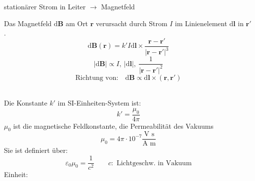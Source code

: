 \documentclass[titlepage,11pt,a4paper,ngerman]{report}
\newcommand{\tx}[1]{\textrm{#1}}
\newcommand{\dd}{\tx{d}}
\renewcommand{\vec}[1]{\boldsymbol{#1}}
\renewcommand{\epsilon}{\varepsilon}
\begin{document}
stationärer Strom in Leiter $ \rightarrow $ Magnetfeld\\
\begin{minipage}{.7\linewidth}
	Das Magnetfeld $ \dd\vec{B} $ am Ort $ \vec{r} $ verursacht durch Strom $ I $ im Linienelement $ \dd \vec{l} $ in $ \vec{r}' $.
	\begin{equation*}
	\dd \vec{B}(\vec{r}) = k' I \dd \vec{l} \times \frac{\vec{r} - \vec{r}'}{|\vec{r} - \vec{r}'|^3}
	\end{equation*}
	\begin{equation*}
	|\dd \vec{B}| \propto I ,\  |\dd \vec{l}| ,\ \frac{1}{|\vec{r} - \vec{r}'|^2}
	\end{equation*}
	\begin{equation*}
	\tx{Richtung von:} \quad \dd \vec{B} \propto \dd\vec{l} \times (\vec{r},\vec{r}')
	\end{equation*}
\end{minipage}%
\begin{minipage}{.3\linewidth}
	\centering
\end{minipage}%
\\
Die Konstante $ k' $ im SI-Einheiten-System ist:
\begin{equation*}
k' = \frac{\mu_0}{4 \pi}
\end{equation*}
$ \mu_0 $ ist die magnetische Feldkonstante, die Permeabilität des Vakuums
\begin{equation*}
\mu_0 = 4 \pi \cdot 10^{-7} \frac{\tx{V s}}{\tx{A m}}
\end{equation*}
Sie ist definiert über:
\begin{equation*}
\epsilon_0 \mu_0 = \frac{1}{c^2} \qquad c: \tx{ Lichtgeschw. in Vakuum}
\end{equation*}
Einheit:
\end{document}
